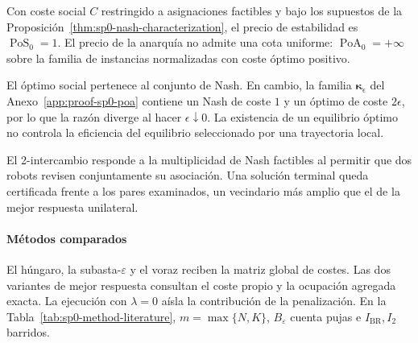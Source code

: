 \begin{corolario}
\label{cor:sp0-pos-poa}
Con coste social $C$ restringido a asignaciones factibles y bajo los supuestos de
la Proposición~\ref{thm:sp0-nash-characterization}, el precio de estabilidad es
$\operatorname{PoS}_0=1$. El precio de la anarquía no admite una cota uniforme:
$\operatorname{PoA}_0=+\infty$ sobre la familia de instancias normalizadas con
coste óptimo positivo.
\end{corolario}
El óptimo social pertenece al conjunto de Nash. En cambio, la familia
$\boldsymbol\kappa_\epsilon$ del Anexo~\ref{app:proof-sp0-poa} contiene un Nash
de coste $1$ y un óptimo de coste $2\epsilon$, por lo que la razón diverge al
hacer $\epsilon\downarrow0$. La existencia de un equilibrio óptimo no controla
la eficiencia del equilibrio seleccionado por una trayectoria local.

El 2-intercambio responde a la multiplicidad de Nash factibles al permitir que dos robots revisen conjuntamente su asociación. Una solución terminal queda certificada frente a los pares examinados, un vecindario más amplio que el de la mejor respuesta unilateral.

\paragraph{Métodos comparados}

El húngaro, la subasta-\(\varepsilon\) y el voraz reciben la matriz global de costes. Las dos variantes de mejor respuesta consultan el coste propio y la ocupación agregada exacta. La ejecución con \(\lambda=0\) aísla la contribución de la penalización. En la Tabla~\ref{tab:sp0-method-literature}, \(m=\max\{N,K\}\), \(B_\varepsilon\) cuenta pujas e \(I_{\mathrm{BR}},I_2\) barridos.

